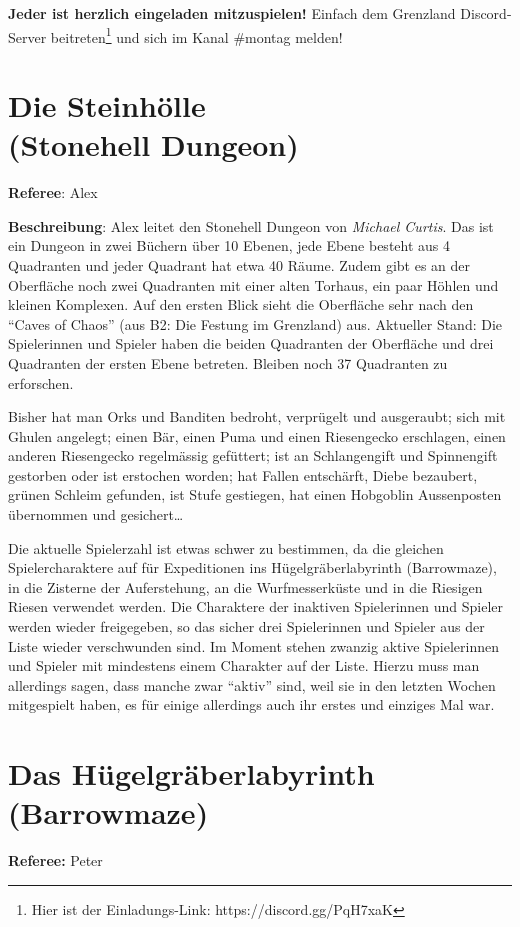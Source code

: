 \documentclass[11pt]{wbzine}
\begin{document}
\begin{multicols}{2}
\textbf{Jeder ist herzlich eingeladen mitzuspielen!} Einfach dem Grenzland
Discord-Server beitreten\footnote{Hier ist der Einladungs-Link:
https://discord.gg/PqH7xaK} und sich im Kanal \#montag melden!


\section{Die Steinhölle\\ (Stonehell Dungeon)}
\label{stonehell}
\textbf{Referee}: Alex

    \textbf{Beschreibung}: Alex leitet den Stonehell Dungeon von
    \textit{Michael Curtis}. Das ist ein Dungeon in zwei Büchern
    über 10 Ebenen, jede Ebene besteht aus 4 Quadranten und jeder
    Quadrant hat etwa 40 Räume. Zudem gibt es an der Oberfläche noch
    zwei Quadranten mit einer alten Torhaus, ein paar Höhlen und
    kleinen Komplexen. Auf den ersten Blick sieht die Oberfläche
    sehr nach den “Caves of Chaos” (aus B2: Die Festung im
    Grenzland) aus. Aktueller Stand: Die
    Spielerinnen und Spieler haben die beiden Quadranten der
    Oberfläche und drei Quadranten der ersten Ebene betreten.
    Bleiben noch 37 Quadranten zu erforschen.

    Bisher hat man Orks und Banditen bedroht, verprügelt und
    ausgeraubt; sich mit Ghulen angelegt; einen Bär, einen Puma und
    einen Riesengecko erschlagen, einen anderen Riesengecko
    regelmässig gefüttert; ist an Schlangengift und Spinnengift
    gestorben oder ist erstochen worden; hat Fallen entschärft,
    Diebe bezaubert, grünen Schleim gefunden, ist Stufe gestiegen,
    hat einen Hobgoblin Aussenposten übernommen und gesichert…

    Die aktuelle Spielerzahl ist etwas schwer zu bestimmen, da die
    gleichen Spielercharaktere auf für Expeditionen ins
    Hügelgräberlabyrinth (Barrowmaze), in die Zisterne der
    Auferstehung, an die Wurfmesserküste und in
    die Riesigen Riesen verwendet werden. Die Charaktere der
    inaktiven Spielerinnen und Spieler werden wieder freigegeben, so
    das sicher drei Spielerinnen und Spieler aus der Liste wieder
    verschwunden sind. Im Moment stehen zwanzig aktive Spielerinnen
    und Spieler mit mindestens einem Charakter auf der Liste. Hierzu
    muss man allerdings sagen, dass manche zwar “aktiv” sind, weil sie in
    den letzten Wochen mitgespielt haben, es für einige allerdings
    auch ihr erstes und einziges Mal war.


\section{Das Hügelgräberlabyrinth (Barrowmaze)}
\label{barrowmaze}
\textbf{Referee:} Peter


\end{multicols}
\end{document}
